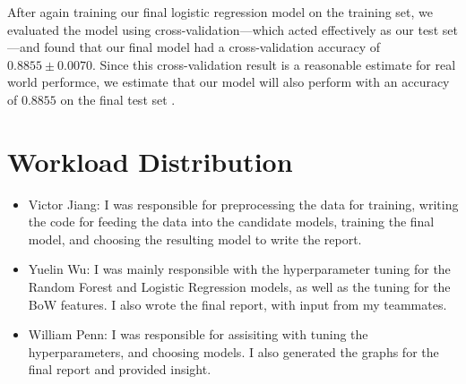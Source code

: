 \documentclass[12pt]{article}
\begin{document}
After again training our final logistic regression model on the training set, we evaluated the model using cross-validation—which acted effectively as our test set—and found that our final model had a cross-validation accuracy of $0.8855\pm 0.0070$. Since this cross-validation result is a reasonable estimate for real world performce, we estimate that our model will also perform with an accuracy of $0.8855$ on the final test set \cite{sklearncrossval}.

\section{Workload Distribution}

\begin{itemize}
	\item Victor Jiang: I was responsible for preprocessing the data for training, writing the code for feeding the data into the candidate models, training the final model, and choosing the resulting model to write the report.
	\item Yuelin Wu: I was mainly responsible with the hyperparameter tuning for the Random Forest and Logistic Regression models, as well as the tuning for the BoW features. I also wrote the final report, with input from my teammates.
	\item William Penn: I was responsible for assisiting with tuning the hyperparameters, and choosing models. I also generated the graphs for the final report and provided insight.
\end{itemize}



\end{document}
